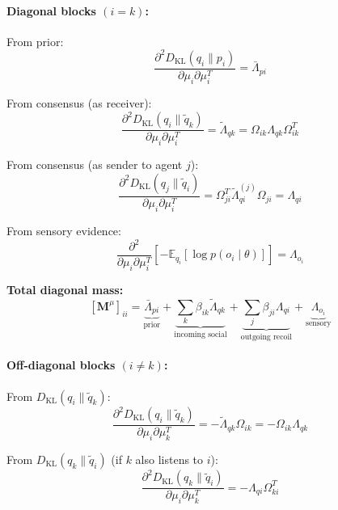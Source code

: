 \documentclass[12pt]{article}
\begin{document}
\paragraph{Diagonal blocks $(i = k)$:}

From prior:
\begin{equation}
\frac{\partial^2 D_{\mathrm{KL}}(q_i \| p_i)}{\partial \mu_i \partial \mu_i^T} = \bar{\Lambda}_{pi}
\end{equation}

From consensus (as receiver):
\begin{equation}
\frac{\partial^2 D_{\mathrm{KL}}(q_i \| \tilde{q}_k)}{\partial \mu_i \partial \mu_i^T} = \tilde{\Lambda}_{qk} = \Omega_{ik}\Lambda_{qk}\Omega_{ik}^T
\end{equation}

From consensus (as sender to agent $j$):
\begin{equation}
\frac{\partial^2 D_{\mathrm{KL}}(q_j \| \tilde{q}_i)}{\partial \mu_i \partial \mu_i^T} = \Omega_{ji}^T\tilde{\Lambda}_{qi}^{(j)}\Omega_{ji} = \Lambda_{qi}
\end{equation}

From sensory evidence:
\begin{equation}
\frac{\partial^2}{\partial \mu_i \partial \mu_i^T}\left[-\mathbb{E}_{q_i}[\log p(o_i \mid \theta)]\right] = \Lambda_{o_i}
\end{equation}

\textbf{Total diagonal mass:}
\begin{equation}
\boxed{
[\mathbf{M}^\mu]_{ii} = \underbrace{\bar{\Lambda}_{pi}}_{\text{prior}} + \underbrace{\sum_k \beta_{ik}\tilde{\Lambda}_{qk}}_{\text{incoming social}} + \underbrace{\sum_j \beta_{ji}\Lambda_{qi}}_{\text{outgoing recoil}} + \underbrace{\Lambda_{o_i}}_{\text{sensory}}
}
\label{eq:mass_diagonal}
\end{equation}

\paragraph{Off-diagonal blocks $(i \neq k)$:}

From $D_{\mathrm{KL}}(q_i \| \tilde{q}_k)$:
\begin{equation}
\frac{\partial^2 D_{\mathrm{KL}}(q_i \| \tilde{q}_k)}{\partial \mu_i \partial \mu_k^T} = -\tilde{\Lambda}_{qk}\Omega_{ik} = -\Omega_{ik}\Lambda_{qk}
\end{equation}

From $D_{\mathrm{KL}}(q_k \| \tilde{q}_i)$ (if $k$ also listens to $i$):
\begin{equation}
\frac{\partial^2 D_{\mathrm{KL}}(q_k \| \tilde{q}_i)}{\partial \mu_i \partial \mu_k^T} = -\Lambda_{qi}\Omega_{ki}^T
\end{equation}
\end{document}
